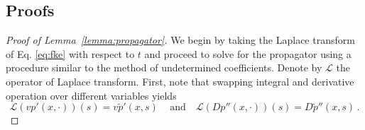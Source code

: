 \documentclass[preprint,12pt]{elsarticle}
\numberwithin{equation}{section}
\theoremstyle{plain} \newtheorem{theorem}{Theorem}[section]
\theoremstyle{plain} \newtheorem{proposition}[theorem]{Proposition}
\theoremstyle{plain} \newtheorem{lemma}[theorem]{Lemma}
\theoremstyle{plain} \newtheorem{corollary}[theorem]{Corollary}
\theoremstyle{definition} \newtheorem{definition}[theorem]{Definition}
\theoremstyle{definition} \newtheorem{notation}[theorem]{Notation}
\theoremstyle{remark} \newtheorem{remark}[theorem]{Remark}
\theoremstyle{remark} \newtheorem{remarks}[theorem]{Remarks}
\theoremstyle{remark} \newtheorem{algorithm2}[theorem]{Algorithm}
\theoremstyle{remark} \newtheorem{example}[theorem]{Example}
\begin{document}
\begin{appendices}

\section{Proofs}\label{ap:proof}

\begin{proof}[Proof of Lemma~\ref{lemma:propagator}]
We begin by taking the Laplace transform of Eq. \eqref{eq:fke} with respect to $t$ and proceed to solve for the propagator using a procedure similar to the method of undetermined coefficients. 
Denote by $\mathcal{L}$ the operator of Laplace transform.
First, note that swapping integral and derivative operation over different variables yields
\begin{equation*}
	\mathcal{L}\left(vp'(x,\cdot)\right)(s)
	=v\tilde{p}'(x,s)\,
	\quad\text{and}\quad
	\mathcal{L}\left(Dp''(x,\cdot)\right)(s)
	=D\tilde{p}''(x,s)\,.
\end{equation*}


\end{proof}
\end{appendices}
\end{document}
